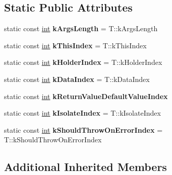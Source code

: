 \subsection*{Static Public Attributes}
\begin{DoxyCompactItemize}
\item 
\mbox{\label{classv8_1_1internal_1_1PropertyCallbackArguments_a000d4d0ae04aa54cd2351d613888b755}} 
static const \mbox{\hyperlink{classint}{int}} {\bfseries k\+Args\+Length} = T\+::k\+Args\+Length
\item 
\mbox{\label{classv8_1_1internal_1_1PropertyCallbackArguments_ae7299585bfeb9b812b2ba7e09478f421}} 
static const \mbox{\hyperlink{classint}{int}} {\bfseries k\+This\+Index} = T\+::k\+This\+Index
\item 
\mbox{\label{classv8_1_1internal_1_1PropertyCallbackArguments_a59f06b3272ceed23bd3599e46acd0a0f}} 
static const \mbox{\hyperlink{classint}{int}} {\bfseries k\+Holder\+Index} = T\+::k\+Holder\+Index
\item 
\mbox{\label{classv8_1_1internal_1_1PropertyCallbackArguments_a6158df38ec13a673626065fed0fcc2a1}} 
static const \mbox{\hyperlink{classint}{int}} {\bfseries k\+Data\+Index} = T\+::k\+Data\+Index
\item 
static const \mbox{\hyperlink{classint}{int}} {\bfseries k\+Return\+Value\+Default\+Value\+Index}
\item 
\mbox{\label{classv8_1_1internal_1_1PropertyCallbackArguments_a77f1ec88fc9fde2de666852361e1a14c}} 
static const \mbox{\hyperlink{classint}{int}} {\bfseries k\+Isolate\+Index} = T\+::k\+Isolate\+Index
\item 
\mbox{\label{classv8_1_1internal_1_1PropertyCallbackArguments_a5a7bab08b2230303ee4c0196c6afaa61}} 
static const \mbox{\hyperlink{classint}{int}} {\bfseries k\+Should\+Throw\+On\+Error\+Index} = T\+::k\+Should\+Throw\+On\+Error\+Index
\end{DoxyCompactItemize}
\subsection*{Additional Inherited Members}


